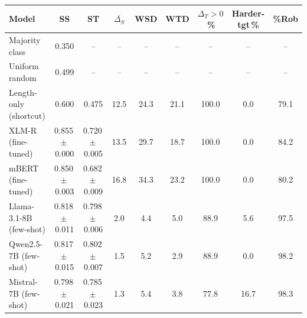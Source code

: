 \begin{tabular}{lcccccccc}
\toprule
Model & SS & ST & $\overline{\Delta_S}$ & WSD & WTD & $\Delta_T{>}0$\,\% & Harder-tgt\,\% & \%Rob \\
\midrule
Majority class & 0.350 & -- & -- & -- & -- & -- & -- & -- \\
Uniform random & 0.499 & -- & -- & -- & -- & -- & -- & -- \\
Length-only (shortcut) & 0.600 & 0.475 & 12.5 & 24.3 & 21.1 & 100.0 & 0.0 & 79.1 \\
\midrule
XLM-R (fine-tuned) & 0.855\,$\pm$\,0.000 & 0.720\,$\pm$\,0.005 & 13.5 & 29.7 & 18.7 & 100.0 & 0.0 & 84.2 \\
mBERT (fine-tuned) & 0.850\,$\pm$\,0.003 & 0.682\,$\pm$\,0.009 & 16.8 & 34.3 & 23.2 & 100.0 & 0.0 & 80.2 \\
\midrule
Llama-3.1-8B (few-shot) & 0.818\,$\pm$\,0.011 & 0.798\,$\pm$\,0.006 & 2.0 & 4.4 & 5.0 & 88.9 & 5.6 & 97.5 \\
Qwen2.5-7B (few-shot) & 0.817\,$\pm$\,0.015 & 0.802\,$\pm$\,0.007 & 1.5 & 5.2 & 2.9 & 88.9 & 0.0 & 98.2 \\
Mistral-7B (few-shot) & 0.798\,$\pm$\,0.021 & 0.785\,$\pm$\,0.023 & 1.3 & 5.4 & 3.8 & 77.8 & 16.7 & 98.3 \\
\bottomrule
\end{tabular}
